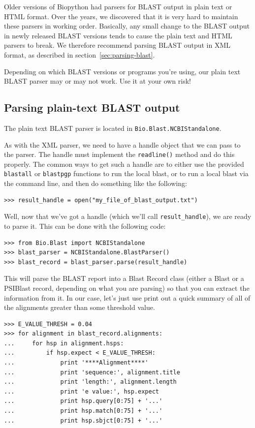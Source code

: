 \documentclass{report}
\begin{document}
Older versions of Biopython had parsers for BLAST output in plain text or HTML
format. Over the years, we discovered that it is very hard to maintain these
parsers in working order. Basically, any small change to the BLAST output in
newly released BLAST versions tends to cause the plain text and HTML parsers
to break. We therefore recommend parsing BLAST output in XML format, as
described in section~\ref{sec:parsing-blast}.

Depending on which BLAST versions or programs you're using, our plain text BLAST parser may or may not work. Use it at your own risk!

\subsection{Parsing plain-text BLAST output}

The plain text BLAST parser is located in \verb|Bio.Blast.NCBIStandalone|.

As with the XML parser, we need to have a handle object that we can pass to the parser. The handle must implement the \verb|readline()| method and do this properly. The common ways to get such a handle are to either use the provided \verb|blastall| or \verb|blastpgp| functions to run the local blast, or to run a local blast via the command line, and then do something like the following:

\begin{verbatim}
>>> result_handle = open("my_file_of_blast_output.txt")
\end{verbatim}

Well, now that we've got a handle (which we'll call \verb|result_handle|),
we are ready to parse it. This can be done with the following code:

\begin{verbatim}
>>> from Bio.Blast import NCBIStandalone
>>> blast_parser = NCBIStandalone.BlastParser()
>>> blast_record = blast_parser.parse(result_handle)
\end{verbatim}

This will parse the BLAST report into a Blast Record class (either a Blast or a PSIBlast record, depending on what you are parsing) so that you can extract the information from it. In our case, let's just use print out a quick summary of all of the alignments greater than some threshold value.

\begin{verbatim}
>>> E_VALUE_THRESH = 0.04
>>> for alignment in blast_record.alignments:
...     for hsp in alignment.hsps:
...         if hsp.expect < E_VALUE_THRESH:
...             print '****Alignment****'
...             print 'sequence:', alignment.title
...             print 'length:', alignment.length
...             print 'e value:', hsp.expect
...             print hsp.query[0:75] + '...'
...             print hsp.match[0:75] + '...'
...             print hsp.sbjct[0:75] + '...'
\end{verbatim}
\end{document}
